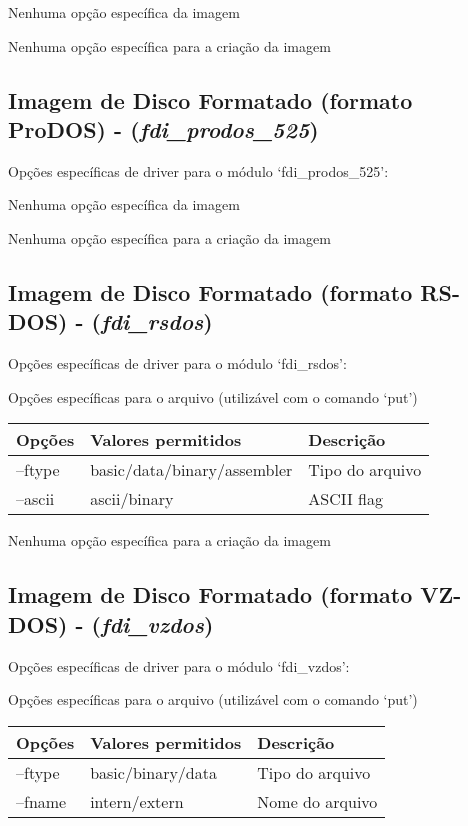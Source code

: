\documentclass[letterpaper,10pt,brazil]{sphinxmanual}
\begin{document}
Nenhuma opção específica da imagem

Nenhuma opção específica para a criação da imagem


\subsection{Imagem de Disco Formatado (formato ProDOS) - (\emph{fdi\_prodos\_525})}
\label{tools/imgtool:imagem-de-disco-formatado-formato-prodos-fdi-prodos-525}
Opções específicas de driver para o módulo `fdi\_prodos\_525':

Nenhuma opção específica da imagem

Nenhuma opção específica para a criação da imagem


\subsection{Imagem de Disco Formatado (formato RS-DOS) - (\emph{fdi\_rsdos})}
\label{tools/imgtool:imagem-de-disco-formatado-formato-rs-dos-fdi-rsdos}
Opções específicas de driver para o módulo `fdi\_rsdos':

Opções específicas para o arquivo (utilizável com o comando `put')

\noindent\begin{tabulary}{\linewidth}{|L|L|L|}
\hline

Opções
&
Valores permitidos
&
Descrição
\\
\hline
--ftype
&
basic/data/binary/assembler
&
Tipo do arquivo
\\
\hline
--ascii
&
ascii/binary
&
ASCII flag
\\
\hline\end{tabulary}


Nenhuma opção específica para a criação da imagem


\subsection{Imagem de Disco Formatado (formato VZ-DOS) - (\emph{fdi\_vzdos})}
\label{tools/imgtool:imagem-de-disco-formatado-formato-vz-dos-fdi-vzdos}
Opções específicas de driver para o módulo `fdi\_vzdos':

Opções específicas para o arquivo (utilizável com o comando `put')

\noindent\begin{tabulary}{\linewidth}{|L|L|L|}
\hline

Opções
&
Valores permitidos
&
Descrição
\\
\hline
--ftype
&
basic/binary/data
&
Tipo do arquivo
\\
\hline
--fname
&
intern/extern
&
Nome do arquivo
\\
\hline\end{tabulary}
\end{document}
